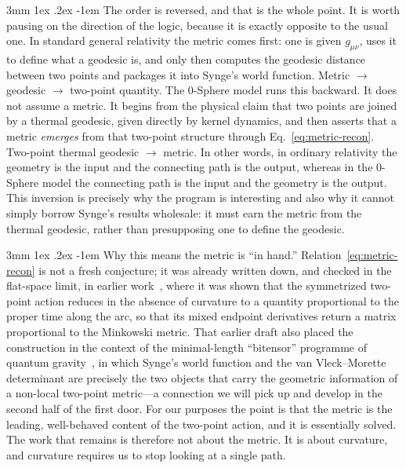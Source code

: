 \documentclass[%
 reprint, amsmath,amssymb, aps, prb, ]{revtex4-2}
\makeatletter
\numberwithin{equation}{section}
\renewcommand\paragraph{%
  \@startsection{paragraph}{4}{\z@}%
    {3mm \@plus 1ex \@minus .2ex}%
    {-1em}%
    {\normalfont\normalsize\itshape}}
\makeatother
\begin{document}
\paragraph{The order is reversed, and that is the whole point.}
It is worth pausing on the direction of the logic, because it is exactly opposite to the usual one. In standard general relativity the metric comes first: one is given $g_{\mu\nu}$, uses it to define what a geodesic is, and only then computes the geodesic distance between two points and packages it into Synge's world function. Metric $\to$ geodesic $\to$ two-point quantity. The 0-Sphere model runs this backward. It does not assume a metric. It begins from the physical claim that two points are joined by a thermal geodesic, given directly by kernel dynamics, and then asserts that a metric \emph{emerges} from that two-point structure through Eq.~\eqref{eq:metric-recon}. Two-point thermal geodesic $\to$ metric. In other words, in ordinary relativity the geometry is the input and the connecting path is the output, whereas in the 0-Sphere model the connecting path is the input and the geometry is the output. This inversion is precisely why the program is interesting and also why it cannot simply borrow Synge's results wholesale: it must earn the metric from the thermal geodesic, rather than presupposing one to define the geodesic.

\paragraph{Why this means the metric is ``in hand.''}
Relation~\eqref{eq:metric-recon} is not a fresh conjecture; it was already written down, and checked in the flat-space limit, in earlier work~\cite{hanamura51}, where it was shown that the symmetrized two-point action reduces in the absence of curvature to a quantity proportional to the proper time along the arc, so that its mixed endpoint derivatives return a matrix proportional to the Minkowski metric. That earlier draft also placed the construction in the context of the minimal-length ``bitensor'' programme of quantum gravity~\cite{Kothawala2023}, in which Synge's world function and the van Vleck--Morette determinant are precisely the two objects that carry the geometric information of a non-local two-point metric---a connection we will pick up and develop in the second half of the first door. For our purposes the point is that the metric is the leading, well-behaved content of the two-point action, and it is essentially solved. The work that remains is therefore not about the metric. It is about curvature, and curvature requires us to stop looking at a single path.
\end{document}
